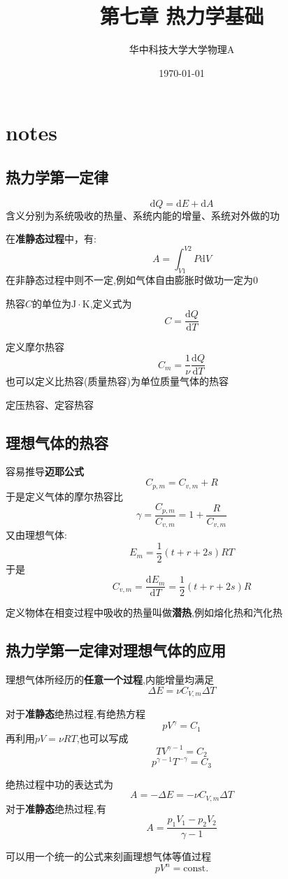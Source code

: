 \documentclass[10pt,a4paper]{article}
\title{第七章 热力学基础}
\author{华中科技大学大学物理A}
\date{\today}
\begin{document}
\maketitle
\section{notes}
\subsection{热力学第一定律}
\[\mathrm{d} Q=\mathrm{d}E+\mathrm{d}A\]
含义分别为系统吸收的热量、系统内能的增量、系统对外做的功

在\textbf{准静态过程}中，有:
\[A=\int_{V1}^{V2} P\mathrm{d}V\]
在非静态过程中则不一定,例如气体自由膨胀时做功一定为0

热容$C$的单位为$\mathrm{J}\cdot\mathrm{K}$,定义式为
\[C=\frac{\mathrm{d}Q}{\mathrm{d}T}\]

定义摩尔热容
\[C_m=\frac{1}{\nu}\frac{\mathrm{d}Q}{\mathrm{d}T}\]
也可以定义比热容(质量热容)为单位质量气体的热容

定压热容、定容热容
\subsection{理想气体的热容}
容易推导\textbf{迈耶公式}
\[\boxed{C_{p,m}=C_{v,m}+R}\]
于是定义气体的摩尔热容比
\[\boxed{\gamma=\frac{C_{p,m}}{C_{v,m}}=1+\frac{R}{C_{v,m}}}\]
又由理想气体:
\[E_m=\frac{1}{2}(t+r+2s)RT\]
于是\[C_{v,m}=\frac{\mathrm{d}E_m}{\mathrm{d}T}=\frac{1}{2}(t+r+2s)R\]

定义物体在相变过程中吸收的热量叫做\textbf{潜热},例如熔化热和汽化热
\subsection{热力学第一定律对理想气体的应用}
理想气体所经历的\textbf{任意一个过程},内能增量均满足
\[\Delta E=\nu C_{V,m}\Delta T\]

对于\textbf{准静态}绝热过程,有绝热方程
\[pV^\gamma=C_1\]
再利用$pV=\nu RT$,也可以写成
\[TV^{\gamma-1}=C_2\]
\[p^{\gamma-1}T^{-\gamma}=C_3\]

绝热过程中功的表达式为\[A=-\Delta E=-\nu C_{V,m}\Delta T\]
对于\textbf{准静态}绝热过程,有
\[A=\frac{p_1V_1-p_2V_2}{\gamma-1}\]

可以用一个统一的公式来刻画理想气体等值过程
\[pV^n=\mathrm{const.}\]
\end{document}
